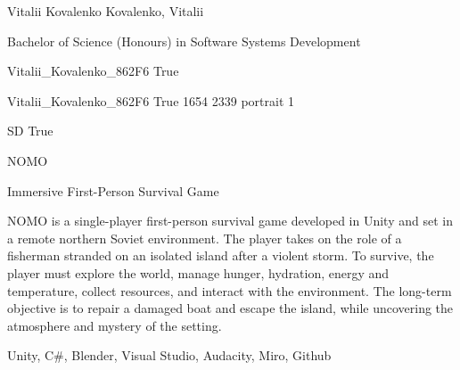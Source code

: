 
\begingroup{}\relax



\def\Key{Vitalii_Kovalenko_862F6}

{Vitalii Kovalenko}
{Kovalenko, Vitalii}

{Bachelor of Science (Honours) in Software Systems Development}

{Vitalii_Kovalenko_862F6}
{True}

{Vitalii_Kovalenko_862F6}
{True}
{1654}
{2339}
{portrait}
{1}

{SD}
{True}

{NOMO}

{Immersive First-Person Survival Game}

{NOMO is a single-player first-person survival game developed in Unity and set in a remote northern Soviet environment. The player takes on the role of a fisherman stranded on an isolated island after a violent storm. To survive, the player must explore the world, manage hunger, hydration, energy and temperature, collect resources, and interact with the environment. The long-term objective is to repair a damaged boat and escape the island, while uncovering the atmosphere and mystery of the setting.}

{Unity, C\#, Blender, Visual Studio, Audacity, Miro, Github}

